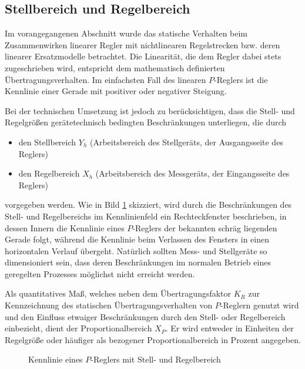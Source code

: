 \subsection{Stellbereich und Regelbereich}

Im vorangegangenen Abschnitt wurde das statische Verhalten beim Zusammenwirken linearer Regler mit nichtlinearen Regelstrecken bzw. deren linearer Ersatzmodelle betrachtet.
Die Linearität, die dem Regler dabei stets zugeschrieben wird, entspricht dem mathematisch definierten Übertragungsverhalten.
Im einfachsten Fall des linearen \(P\)-Reglers ist die Kennlinie einer Gerade mit positiver oder negativer Steigung.

Bei der technischen Umsetzung ist jedoch zu berücksichtigen, dass die Stell- und Regelgrößen gerätetechnisch bedingten Beschränkungen unterliegen, die durch
\begin{itemize}
    \item den Stellbereich \(Y_h\) (Arbeitsbereich des Stellgeräts, der Ausgangsseite des Reglers)
    \item den Regelbereich \(X_h\) (Arbeitsbereich des Messgeräts, der Eingangsseite des Reglers)
\end{itemize}
vorgegeben werden.
Wie in Bild \ref{fig:2-12} skizziert, wird durch die Beschränkungen des Stell- und Regelbereichs im Kennlinienfeld ein Rechteckfenster beschrieben, in dessen Innern die Kennlinie eines \(P\)-Reglers der bekannten schräg liegenden Gerade folgt, während die Kennlinie beim Verlassen des Fensters in einen horizontalen Verlauf übergeht.
Natürlich sollten Mess- und Stellgeräte so dimensioniert sein, dass deren Beschränkungen im normalen Betrieb eines geregelten Prozesses möglichst nicht erreicht werden.

Als quantitatives Maß, welches neben dem Übertragungsfaktor \(K_R\) zur Kennzeichnung des statischen Übertragungsverhalten von \(P\)-Reglern genutzt wird und den Einfluss etwaiger Beschränkungen durch den Stell- oder Regelbereich einbezieht, dient der Proportionalbereich \(X_P\).
Er wird entweder in Einheiten der Regelgröße oder häufiger als bezogener Proportionalbereich in Prozent angegeben.

\begin{figure}[h]
    \centering
    \caption{Kennlinie eines \(P\)-Reglers mit Stell- und Regelbereich}
    \label{fig:2-12}
\end{figure}

